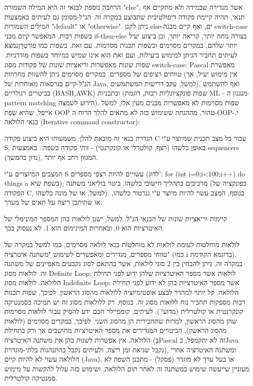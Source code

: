         הרחבה נוספת לבנאי זה היא המילה השמורה "else", אשר מגדירה שבמידה ולא מתקיים אף
        תנאי, תהיה קיימת פקודה דיפולטיבית שתבוצע במקרה זה. הנ"ל-מסומן גם לעיתים באמצעות
        המילים השמורות "default" או "otherwise". ניתן לקנן else-ים, ואף קיים מבנה
        switch-case בשפות רבות, המאפשר קיום מבני if-then-else בצורה נוחה יותר, קריאה
        יותר, וכן ביצוע יעיל יותר שלהם, במקרים מסוימים ובשפות תכנות מסוימות. עם זאת,
        בשפות כמו פוֹרְטְרָןנמצא לעיתים תחביר הניתן למימוש ביעילות, ועם זאת הוא אינו שמיש
        במיוחד בשפות מודרניות. שפות שונות מאפשרות וריאציות שונות של פקודות מסוג
        switch-case: Pascal מאפשרת טווחים רציפים של מספרים, במקרים מסוימים ניתן להשוות
        מחרוזות (אין מימוש יעיל, אך הנ"ל-קיים בגרסאות מאוחרות של Java, למשל, עקב דרישות
        המשתמשים), ואף להשתמש בביטויים רגולריים (BASH,AWK) ובתבניות (שפות פונקציונליות
        רבות, דוגמת ML - מנגנון ה- pattern matching הידוע לשמצה). שפות מסוימות לא
        מאפשרות מבנים מעין אלו, למשל אייפל, שהיא שְׂפַת OOP טהור, מההנחה ששימוש כזה לא
        מתאים להלך הרוח ה-OOP-י.
        בנאי הלולאה (Iterative command constructor):

        הגדרת בנאי זה מובאת להלן:
        משמעותו היא ביצוע פקודה C עבור כל מצב תכנית שמיוצר ע"י S, באופן כלשהו (רצף,
        קולטרלי או קונקרנטי) - זוהי פקודה בשפה.. באמצעות sequencers (נדון בהמשך),
        המגוון רחב אף יותר.

        המצבים המיוצרים ע"י S עשויים להיות רצפי מספרים (לדוג': for (int i=0;i<100;i++)
        {do things} a בשפת שיא), מרכיבים בתהליך חישובי כלשהו, ביטוי בוליאני משתנה
        (כפונקציה של הפקודה C, למשל, או של מונה כלשהו). בנוסף, המצב עשוי להיות מיוצר
        ע"י גנרטור כלשהו, או שתיתכן ריצה על תאים של מערך.

        קיימות וריאציות שונות של הבנאי הנ"ל. למשל, ישנן לולאות בהן המספר המינימלי של
        האיטרציות הוא 0, ובאחרות המינימום הוא 1. לא נעסוק בכך.

        לולאות מוחלטות לעומת לולאות לא מוחלטות
        בנאי לולאה מסוימים, כמו למשל במקרה של טווחי מספרים, מגדירים ומאפשרים לשימוש
        "משתנה איטרציה" (כמו i בדוגמא הקודמת). במקרה זה, ניתן להבחין בין 2 סוגי לולאות,
        אשר בהתאם לסוג נקבעים מאפיינים של משתנה זה. לולאות מסוג Definite Loop: לולאות
        אשר מספר האיטרציות שלהן ידוע לפני תחילת הלולאה.
        לולאות מסוג Indefinite Loop: אשר מספר האיטרציות בהן לא ידוע לפני תחילת הלולאה.
        קל יותר למהדר לבצע אופטימיזציה ללולאות מהסוג הראשון. לפיכך, שפות תכנות רבות מספקות תחביר נוח ללואות מסוג זה. בנוסף, רק ללולאות מסוג זה יש תמיכה בסמנטיקה קונקרנטית או קולטרלית (מדוע?). לעיתים, קומפיילר חכם ידע להסיק עבור לולאות מסוימות שהן מהסוג הראשון, למרות שתחבירית הן מהסוג השני.
        לפיכך, במקרים מסוימים (לולאות מהסוג הראשון), הביטויים המגדירים את מספר האיטרציות מחושבים אך ורק בתחילת הלולאה, אין אפשרות לשנות בהן את משתנה האיטרציה (בְּPascal זה לא יתקמפל, בJava נקבל שגיאת זמן ריצה, ולעיתים נקבל בהתנהגות בלתי-מוגדרת), ומשתנה האיטרציה אחרי הלולאה עשוי לא להיות קיים (Java), או בעל ערך לא מוגדר (פסקל) - מתכנן השפה לא מעוניין שייעשה שימוש במשתנה זה לאחר תום הלולאה, ושימוש כזה עלול להקשות על מימוש סמנטיקה קולטרלית.

